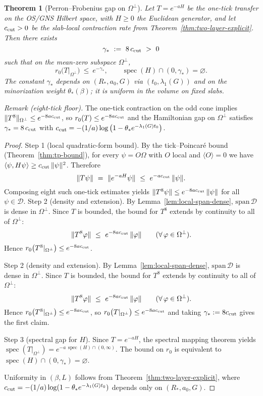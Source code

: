 \documentclass[11pt]{amsart}
\theoremstyle{plain}
\newtheorem{theorem}{Theorem}[section]
\theoremstyle{definition}
\theoremstyle{remark}
\begin{document}
\begin{theorem}[Perron--Frobenius gap on $\Omega^{\perp}$]\label{thm:pf-gap-meanzero}
Let $T=e^{-aH}$ be the one-tick transfer on the OS/GNS Hilbert space, with $H\ge 0$ the Euclidean generator, and let $c_{\rm cut}>0$ be the slab-local contraction rate from Theorem~\ref{thm:two-layer-explicit}. Then there exists
\[
  \gamma_*\ :=\ 8\,c_{\rm cut}\ >\ 0
\]
such that on the mean-zero subspace $\Omega^{\perp}$,
\[
  r_0\bigl(T|_{\Omega^{\perp}}\bigr)\ \le\ e^{-\gamma_*},\qquad
  \operatorname{spec}(H)\cap(0,\gamma_*)=\varnothing.
\]
The constant $\gamma_*$ depends on $(R_*,a_0,G)$ via $(t_0,\lambda_1(G))$ and on the minorization weight $\theta_*(\beta)$; it is uniform in the volume on fixed slabs.
\end{theorem}
\noindent\emph{Remark (eight-tick floor).} The one-tick contraction on the odd cone implies $\|T^8\|_{\Omega^{\perp}}\le e^{-8 a c_{\rm cut}}$, so $r_0(T)\le e^{-8 a c_{\rm cut}}$ and the Hamiltonian gap on $\Omega^{\perp}$ satisfies $\gamma_* = 8\,c_{\rm cut}$ with $c_{\rm cut}=-(1/a)\log\big(1-\theta_* e^{-\lambda_1(G) t_0}\big)$.

\begin{proof}
Step 1 (local quadratic-form bound). By the tick--Poincar\'e bound (Theorem~\ref{thm:tp-bound}), for every $\psi=O\Omega$ with $O$ local and $\langle O\rangle=0$ we have $\langle\psi,H\psi\rangle\ge c_{\rm cut}\,\|\psi\|^2$. Therefore
\[
  \|T\psi\|\ =\ \|e^{-aH}\psi\|\ \le\ e^{-a c_{\rm cut}}\,\|\psi\|.
\]
Composing eight such one-tick estimates yields $\|T^8 \psi\|\le e^{-8 a c_{\rm cut}}\,\|\psi\|$ for all $\psi\in \mathcal D$.
Step 2 (density and extension). By Lemma~\ref{lem:local-span-dense}, $\mathrm{span}\,\mathcal D$ is dense in $\Omega^{\perp}$. Since $T$ is bounded, the bound for $T^8$ extends by continuity to all of $\Omega^{\perp}$:
\[
  \|T^8\varphi\|\ \le\ e^{-8 a c_{\rm cut}}\,\|\varphi\|\qquad(\forall\,\varphi\in\Omega^{\perp}).
\]
Hence $r_0\bigl(T^8|_{\Omega^{\perp}}\bigr)\le e^{-8 a c_{\rm cut}}$.

Step 2 (density and extension). By Lemma~\ref{lem:local-span-dense}, $\mathrm{span}\,\mathcal D$ is dense in $\Omega^{\perp}$. Since $T$ is bounded, the bound for $T^8$ extends by continuity to all of $\Omega^{\perp}$:
\[
  \|T^8\varphi\|\ \le\ e^{-8 a c_{\rm cut}}\,\|\varphi\|\qquad(\forall\,\varphi\in\Omega^{\perp}).
\]
Hence $r_0\bigl(T^8|_{\Omega^{\perp}}\bigr)\le e^{-8 a c_{\rm cut}}$, so $r_0\bigl(T|_{\Omega^{\perp}}\bigr)\le e^{-8 a c_{\rm cut}}$ and taking $\gamma_*:=8 c_{\rm cut}$ gives the first claim.

Step 3 (spectral gap for $H$). Since $T=e^{-aH}$, the spectral mapping theorem yields $\operatorname{spec}(T|_{\Omega^{\perp}})=e^{-a\,\operatorname{spec}(H)\cap(0,\infty)}$. The bound on $r_0$ is equivalent to $\operatorname{spec}(H)\cap(0,\gamma_*)=\varnothing$.

Uniformity in $(\beta,L)$ follows from Theorem~\ref{thm:two-layer-explicit}, where $c_{\rm cut}=-(1/a)\log(1-\theta_* e^{-\lambda_1(G)t_0})$ depends only on $(R_*,a_0,G)$.
\end{proof}
\end{document}
